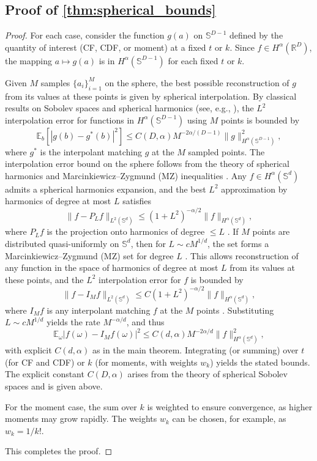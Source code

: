 \subsection{Proof of \cref{thm:spherical_bounds}}
\label{proof:spherical_bounds}
\begin{proof}
For each case, consider the function $g(a)$ on $\mathbb{S}^{D-1}$ defined by the quantity of interest (CF, CDF, or moment) at a fixed $t$ or $k$. Since $f \in H^\alpha(\mathbb{R}^D)$, the mapping $a \mapsto g(a)$ is in $H^\alpha(\mathbb{S}^{D-1})$ for each fixed $t$ or $k$.

Given $M$ samples $\{a_i\}_{i=1}^M$ on the sphere, the best possible reconstruction of $g$ from its values at these points is given by spherical interpolation. By classical results on Sobolev spaces and spherical harmonics (see, e.g., \cite{narcowich2006localized}), the $L^2$ interpolation error for functions in $H^\alpha(\mathbb{S}^{D-1})$ using $M$ points is bounded by
\[
\mathbb{E}_b \left[ |g(b) - g^*(b)|^2 \right] \leq C(D, \alpha) M^{-2\alpha/(D-1)} \| g \|_{H^\alpha(\mathbb{S}^{D-1})}^2,
\]
where $g^*$ is the interpolant matching $g$ at the $M$ sampled points.
The interpolation error bound on the sphere follows from the theory of spherical harmonics and Marcinkiewicz–Zygmund (MZ) inequalities . Any $f \in H^\alpha(\mathbb{S}^d)$ admits a spherical harmonics expansion, and the best $L^2$ approximation by harmonics of degree at most $L$ satisfies
\[
\|f - P_L f\|_{L^2(\mathbb{S}^d)} \leq (1 + L^2)^{-\alpha/2} \|f\|_{H^\alpha(\mathbb{S}^d)},
\]
where $P_L f$ is the projection onto harmonics of degree $\leq L$ \cite[Lemma~2.1]{narcowich2006localized}. If $M$ points are distributed quasi-uniformly on $\mathbb{S}^d$, then for $L \sim c M^{1/d}$, the set forms a Marcinkiewicz–Zygmund (MZ) set for degree $L$ \cite[Theorem 1.1]{mhaskar2001spherical}. This allows reconstruction of any function in the space of harmonics of degree at most $L$ from its values at these points, and the $L^2$ interpolation error for $f$ is bounded by
\[
\|f - I_M f\|_{L^2(\mathbb{S}^d)} \leq C (1 + L^2)^{-\alpha/2} \|f\|_{H^\alpha(\mathbb{S}^d)},
\]
where $I_M f$ is any interpolant matching $f$ at the $M$ points \cite[Theorem 3.1]{narcowich2006localized}. Substituting $L \sim c M^{1/d}$ yields the rate $M^{-\alpha/d}$, and thus
\[
\mathbb{E}_{\omega} |f(\omega) - I_M f(\omega)|^2 \leq C(d, \alpha) M^{-2\alpha/d} \|f\|_{H^\alpha(\mathbb{S}^d)}^2,
\]
with explicit $C(d, \alpha)$ as in the main theorem.
Integrating (or summing) over $t$ (for CF and CDF) or $k$ (for moments, with weights $w_k$) yields the stated bounds. The explicit constant $C(D, \alpha)$ arises from the theory of spherical Sobolev spaces and is given above.

For the moment case, the sum over $k$ is weighted to ensure convergence, as higher moments may grow rapidly. The weights $w_k$ can be chosen, for example, as $w_k = 1/k!$.

This completes the proof.
\end{proof}





